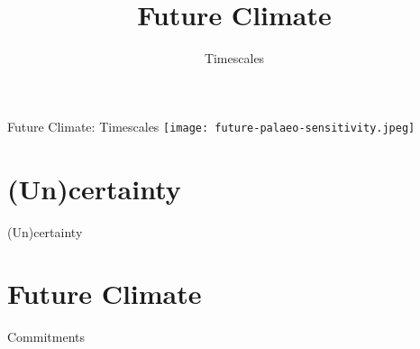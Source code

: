 

\title{Future Climate}
\author{Timescales}



\begin{frame}{Future Climate: Timescales}
    \texttt{[image: future-palaeo-sensitivity.jpeg]}
\end{frame}

\section{(Un)certainty}

\begin{frame}{(Un)certainty}




\end{frame}

\section{Future Climate}

\begin{frame}{Commitments}

 




\end{frame}


